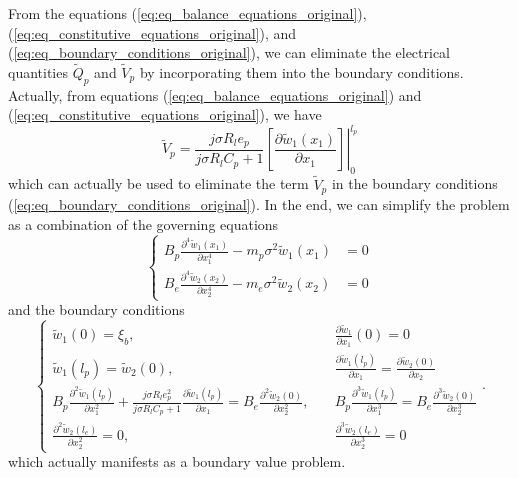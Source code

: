 \documentclass{elsarticle}
\begin{document}
From the equations (\ref{eq:eq_balance_equations_original}), (\ref{eq:eq_constitutive_equations_original}), and (\ref{eq:eq_boundary_conditions_original}), we can eliminate the electrical quantities $\tilde{Q}_p$ and $\tilde{V}_p$ by incorporating them into the boundary conditions. Actually, from equations (\ref{eq:eq_balance_equations_original}) and (\ref{eq:eq_constitutive_equations_original}), we have
\begin{equation}
    \tilde{V}_p = \frac{j \sigma R_l e_p}{j \sigma R_l C_p + 1} \left.\left[ \frac{\partial \tilde{w}_1(x_1)}{\partial x_1} \right]\right|^{l_p}_0
\end{equation}
which can actually be used to eliminate the term $\tilde{V}_p$ in the boundary conditions (\ref{eq:eq_boundary_conditions_original}). In the end, we can simplify the problem as a combination of the governing equations
\begin{equation}
    \left\{\begin{aligned}
        B_p \frac{\partial^4 \tilde{w}_1(x_1)}{\partial x_1^4} - m_p \sigma^2 \tilde{w}_1(x_1) &= 0 \\
        B_e \frac{\partial^4 \tilde{w}_2(x_2)}{\partial x_2^4} - m_e \sigma^2 \tilde{w}_2(x_2) &= 0 
    \end{aligned}\right.
    \label{eq:eq_balance_equations_converted}
\end{equation}
and the boundary conditions
\begin{equation}
    \left\{\begin{aligned}
        \tilde{w}_1(0) = \xi_b , &\quad \frac{\partial \tilde{w}_1}{\partial x_1} (0) = 0 \\
        \tilde{w}_1(l_p) = \tilde{w}_2(0), &\quad \frac{\partial \tilde{w}_1(l_p)}{\partial x_1} = \frac{\partial \tilde{w}_2(0)}{\partial x_2} \\
        B_p \frac{\partial^2 \tilde{w}_1(l_p)}{\partial x_1^2} + \frac{j \sigma R_l e_p^2}{j \sigma R_l C_p + 1}  \frac{\partial \tilde{w}_1(l_p)}{\partial x_1} = B_e \frac{\partial^2 \tilde{w}_2(0)}{\partial x_2^2} , &\quad B_p \frac{\partial^3 \tilde{w}_1(l_p)}{\partial x_1^3} = B_e \frac{\partial^3 \tilde{w}_2(0)}{\partial x_2^3} \\
        \frac{\partial^2 \tilde{w}_2(l_e)}{\partial x_2^2} = 0 , &\quad \frac{\partial^3 \tilde{w}_2(l_e)}{\partial x_2^3} = 0
    \end{aligned}\right..
    \label{eq:eq_boundary_conditions_converted}
\end{equation}
which actually manifests as a boundary value problem.
\end{document}
